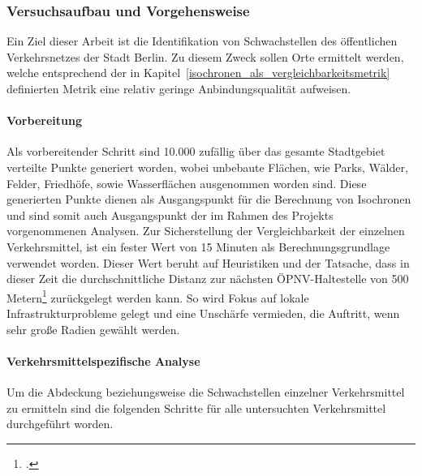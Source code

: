 \subsubsection{Versuchsaufbau und Vorgehensweise}
\label{versuchsaufbau_und_vorgehensweise}

Ein Ziel dieser Arbeit ist die Identifikation von Schwachstellen des öffentlichen Verkehrsnetzes der Stadt Berlin. Zu diesem Zweck sollen Orte ermittelt werden, welche entsprechend der in Kapitel~\ref{isochronen_als_vergleichbarkeitsmetrik} definierten Metrik eine relativ geringe Anbindungsqualität aufweisen.

\paragraph*{Vorbereitung}
\label{vorbereitung}

Als vorbereitender Schritt sind 10.000 zufällig über das gesamte Stadtgebiet verteilte Punkte generiert worden, wobei unbebaute Flächen, wie Parks, Wälder, Felder, Friedhöfe, sowie Wasserflächen ausgenommen worden sind. Diese generierten Punkte dienen als Ausgangspunkt für die Berechnung von Isochronen und sind somit auch Ausgangspunkt der im Rahmen des Projekts vorgenommenen Analysen. Zur Sicherstellung der Vergleichbarkeit der einzelnen Verkehrsmittel, ist ein fester Wert von 15 Minuten als Berechnungsgrundlage verwendet worden. Dieser Wert beruht auf Heuristiken und der Tatsache, dass in dieser Zeit die durchschnittliche Distanz zur nächsten ÖPNV-Haltestelle von 500 Metern\footcite{cnb} zurückgelegt werden kann. So wird Fokus auf lokale Infrastrukturprobleme gelegt und eine Unschärfe vermieden, die Auftritt, wenn sehr große Radien gewählt werden.

\paragraph*{Verkehrsmittelspezifische Analyse}
\label{verkehrsmittelspezifische_analyse}

Um die Abdeckung beziehungsweise die Schwachstellen einzelner Verkehrsmittel zu ermitteln sind die folgenden Schritte für alle untersuchten Verkehrsmittel durchgeführt worden.


